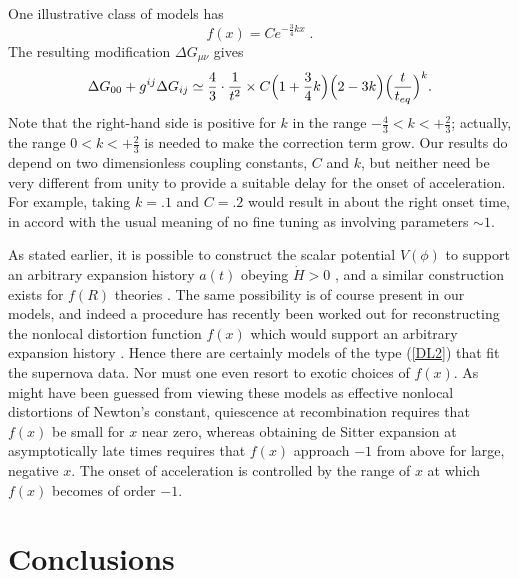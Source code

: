 \documentclass[12pt]{article}
\begin{document}
One illustrative class of models has
\begin{equation}
f(x) = C e^{-\frac34 k x} \; .
\end{equation}
The resulting modification $\Delta G_ {\mu\nu}$ gives
\begin{equation}
\Delta G_{00} + g^{ij}
\Delta G_{ij} \simeq \frac43 \cdot \frac1{t^2} \times C \Bigl(1 + \frac34 k
\Bigr) \Bigl(2 - 3 k\Bigr) \Bigl(\frac{t}{t_{eq}}\Bigr)^k .
\end{equation}
Note that the right-hand side is positive for $k$ in the range $-\frac43 <
k < + \frac23$; actually, the range $0 < k < +\frac23$ is needed to make
the correction term grow. Our results do depend on two dimensionless
coupling constants, $C$ and $k$, but neither need be very different from
unity to provide a suitable delay for the onset of acceleration. For example, 
taking $k = .1$ and $C = .2$ would result in about the right onset time, in
accord with the usual meaning of no fine tuning as involving parameters $\sim1$.

As stated earlier, it is possible to construct the scalar potential
$V(\phi)$ to support an arbitrary expansion history $a(t)$ obeying
$\dot{H} > 0$ \cite{TW,SRSS}, and a similar construction exists for 
$f(R)$ theories \cite{NO,RPW}. The same possibility is of course present
in our models, and indeed a procedure has recently been worked out for 
reconstructing the nonlocal distortion function $f(x)$ which would support 
an arbitrary expansion history \cite{DW}. Hence there are certainly 
models of the type (\ref{DL2}) that fit the supernova data. Nor must one
even resort to exotic choices of $f(x)$. As might have been guessed from 
viewing these models as effective nonlocal distortions of Newton's
constant, quiescence at recombination requires that $f(x)$ be small for
$x$ near zero, whereas obtaining de Sitter expansion at asymptotically
late times requires that $f(x)$ approach $-1$ from above for large,
negative $x$. The onset of acceleration is controlled by the range of $x$
at which $f(x)$ becomes of order $-1$.

\section{Conclusions}
\end{document}
